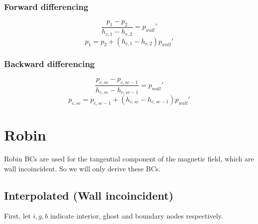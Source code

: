 \documentclass[11pt]{article}
\begin{document}
\subsubsection{Forward differencing}
\begin{equation}
	\frac{p_1-p_2}{h_{c,1}-h_{c,2}} = p_{wall}'
\end{equation}
\begin{equation}
	p_1 = p_2 + (h_{c,1} - h_{c,2}) p_{wall}'
\end{equation}
\subsubsection{Backward differencing}
\begin{equation}
	\frac{p_{c,sc}-p_{c,sc-1}}{h_{c,sc}-h_{c,sc-1}} = p_{wall}'
\end{equation}
\begin{equation}
	p_{c,sc} = p_{c,sc-1} + (h_{c,sc} - h_{c,sc-1}) p_{wall}'
\end{equation}



\section{Robin}
Robin BCs are used for the tangential component of the magnetic field, which are wall incoincident.
So we will only derive these BCs.

\subsection{Interpolated (Wall incoincident)}
First, let $i,g,b$ indicate interior, ghost and boundary nodes respectively.
\end{document}
